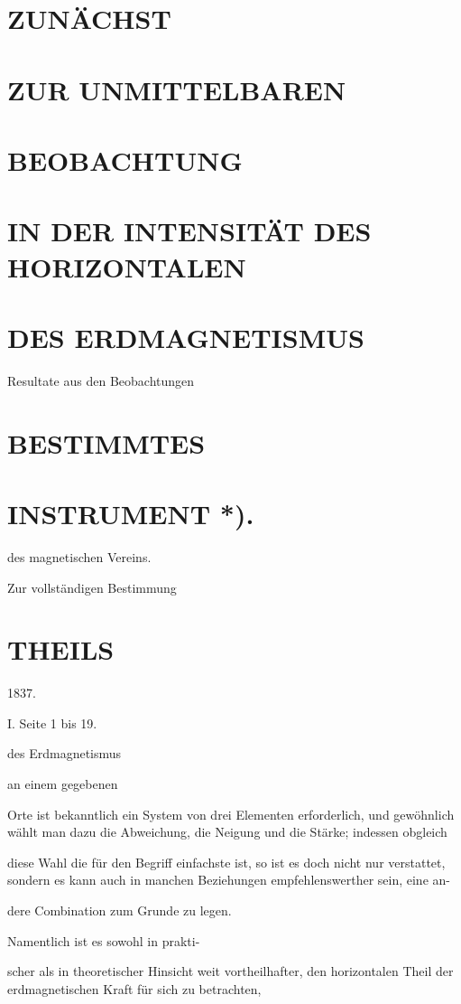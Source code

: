 \documentclass[12pt,a4paper]{article}
\begin{document}
\section*{ZUNÄCHST}
\section*{ZUR UNMITTELBAREN}
\section*{BEOBACHTUNG}
\section*{IN DER INTENSITÄT DES HORIZONTALEN}
\section*{DES ERDMAGNETISMUS}
Resultate aus den Beobachtungen

\section*{BESTIMMTES}
\section*{INSTRUMENT *).}
des magnetischen Vereins.

Zur vollständigen Bestimmung

\section*{THEILS}
1837.

I. Seite 1 bis 19.

des Erdmagnetismus

an einem gegebenen

Orte ist bekanntlich ein System von drei Elementen erforderlich, und gewöhnlich wählt man dazu die Abweichung, die Neigung und die Stärke; indessen obgleich

diese Wahl die für den Begriff einfachste ist, so ist es doch nicht nur verstattet, sondern es kann auch in manchen Beziehungen empfehlenswerther sein, eine an-

dere Combination zum Grunde zu legen.

Namentlich ist es sowohl in prakti-

scher als in theoretischer Hinsicht weit vortheilhafter, den horizontalen Theil der erdmagnetischen Kraft für sich zu betrachten,
\end{document}
